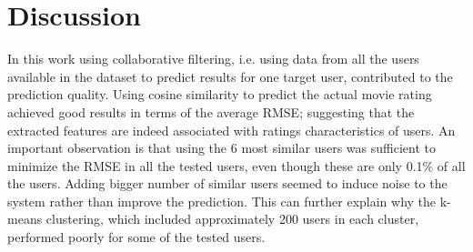 \section{Discussion}
\label{sec:discussion}

In this work using collaborative filtering, i.e. using data from all the users available in the dataset to predict results for one target user, contributed to the prediction quality. Using cosine similarity to predict the actual movie rating achieved good results in terms of the average RMSE; suggesting that the extracted features are indeed associated with ratings characteristics of users. An important observation is that using the 6 most similar users was sufficient to minimize the RMSE in all the tested users, even though these are only 0.1\% of all the users. Adding bigger number of similar users seemed to induce noise to the system rather than improve the prediction. This can further explain why the k-means clustering, which included approximately 200 users in each cluster, performed poorly for some of the tested users.

